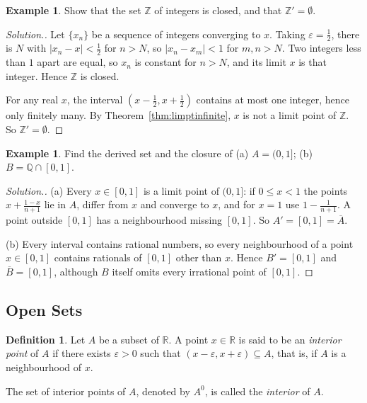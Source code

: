 \documentclass[11pt,a4paper]{article}
\numberwithin{equation}{section}
\theoremstyle{definition}
\newtheorem{defn}[thm]{Definition}
\newtheorem{exa}[thm]{Example}
\newenvironment{solution}
  {\renewcommand{\qedsymbol}{}\begin{proof}[\textit{Solution}.]}
  {\end{proof}}
\begin{document}
\begin{exa}
Show that the set $\mathbb{Z}$ of integers is closed, and that $\mathbb{Z}' = \emptyset$.
\end{exa}

\begin{solution}
Let $\{x_n\}$ be a sequence of integers converging to $x$. Taking $\varepsilon = \frac{1}{2}$, there is $N$ with $|x_n - x|<\frac{1}{2}$ for $n>N$, so $|x_n - x_m|<1$ for $m,n>N$. Two integers less than $1$ apart are equal, so $x_n$ is constant for $n>N$, and its limit $x$ is that integer. Hence $\mathbb{Z}$ is closed.

For any real $x$, the interval $\left(x-\frac{1}{2}, x+\frac{1}{2}\right)$ contains at most one integer, hence only finitely many. By Theorem~\ref{thm:limptinfinite}, $x$ is not a limit point of $\mathbb{Z}$. So $\mathbb{Z}' = \emptyset$.
\end{solution}

\begin{exa}
Find the derived set and the closure of (a) $A = (0,1]$; (b) $B = \mathbb{Q}\cap[0,1]$.
\end{exa}

\begin{solution}
(a) Every $x\in[0,1]$ is a limit point of $(0,1]$: if $0\leq x<1$ the points $x + \frac{1-x}{n+1}$ lie in $A$, differ from $x$ and converge to $x$, and for $x=1$ use $1-\frac{1}{n+1}$. A point outside $[0,1]$ has a neighbourhood missing $[0,1]$. So $A' = [0,1] = \overline{A}$.

(b) Every interval contains rational numbers, so every neighbourhood of a point $x\in[0,1]$ contains rationals of $[0,1]$ other than $x$. Hence $B' = [0,1]$ and $\overline{B} = [0,1]$, although $B$ itself omits every irrational point of $[0,1]$.
\end{solution}


\subsection{Open Sets}

\begin{defn}
Let $A$ be a subset of $\mathbb{R}$. A point $x\in \mathbb{R}$ is said to be an \emph{interior point} of $A$ if there exists $\varepsilon > 0$ such that $( x - \varepsilon, x + \varepsilon ) \subseteq A$, that is, if $A$ is a neighbourhood of $x$.

The set of interior points of $A$, denoted by $A^0$, is called the \emph{interior} of $A$.
\end{defn}
\end{document}
